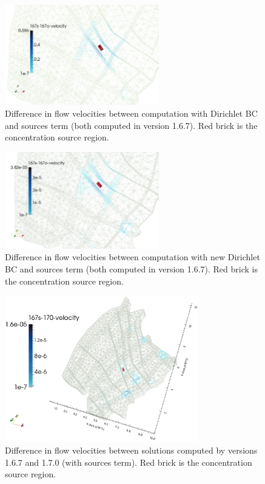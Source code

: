 \begin{figure}[!h]
        \centering
        \includegraphics[width=0.60\textwidth]{tests_graphics/mel_167s-167_velocity.pdf}
        \caption{Difference in flow velocities between computation with Dirichlet BC and sources term (both computed in version 1.6.7). 
                 Red brick is the concentration source region.}
        \label{fig:bench_mel1}
\end{figure}
%
\begin{figure}[!h]
        \centering
        \includegraphics[width=0.60\textwidth]{tests_graphics/mel_167s-167o_velocity_equal.pdf}
        \caption{Difference in flow velocities between computation with new Dirichlet BC and sources term (both computed in version 1.6.7). 
                 Red brick is the concentration source region.}
        \label{fig:bench_mel2}
\end{figure}
%
\begin{figure}[!h]
        \centering
        \includegraphics[width=0.75\textwidth]{tests_graphics/mel_167s-170_velocity_equal.pdf}
        \caption{Difference in flow velocities between solutions computed by versions 1.6.7 and 1.7.0 (with sources term).
                 Red brick is the concentration source region.}
        \label{fig:bench_mel5}
\end{figure}


